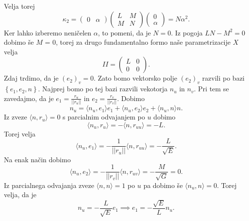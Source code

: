 Velja torej \begin{equation*}
  \kappa_2 = \begin{pmatrix}
      0 & \alpha
  \end{pmatrix} \begin{pmatrix}
  L & M \\
  M & N
  \end{pmatrix} \begin{pmatrix}
    0 \\ \alpha
  \end{pmatrix} = N \alpha^2.
\end{equation*}
Ker lahko izberemo neničelen $\alpha$, to pomeni, da je $N = 0.$ Iz pogoja $LN - M^2 = 0$ dobimo še $M$ = 0, torej za drugo fundamentalno formo naše parametrizacije $X$ velja \begin{equation*}
II = \begin{pmatrix}
L & 0 \\
0 & 0
\end{pmatrix}.
\end{equation*}  
Zdaj trdimo, da je $(e_2)_v = 0$. Zato bomo vektorsko polje $(e_2)_v$ razvili po bazi $\left\{ e_1, e_2, n\right\}$. Najprej bomo po tej bazi
razvili vekotorja $n_u$ in $n_v$. Pri tem se zavedajmo, da je $e_1 = \frac{r_u}{\lvert\lvert r_u \rvert\rvert }$ in $e_2 = \frac{r_v}{\lvert\lvert r_v \rvert\rvert }$.
Dobimo \begin{equation*}
n_u = \langle n_u, e_1 \rangle e_1 + \langle n_u, e_2 \rangle e_2 + \langle n_u, n \rangle n. 
\end{equation*}  
Iz zveze $\langle n, r_u \rangle = 0$ s parcialnim odvajanjem po $u$ dobimo \begin{equation*}
  \langle n_u, r_u \rangle = - \langle n, r_{uu} \rangle  = -L.
\end{equation*}  
Torej velja \begin{equation*}
\langle n_u, e_1 \rangle = -\frac{1}{\lvert\lvert r_u \rvert\rvert } \langle n, r_{uu} \rangle = -\frac{L}{\sqrt{E}}.   
\end{equation*}  
Na enak način dobimo \begin{equation*}
\langle n_u, e_2 \rangle = -\frac{1}{\lvert\lvert r_v \rvert\rvert } \langle n, r_{uv} \rangle = -\frac{M}{\sqrt{G}} = 0.
\end{equation*}  
Iz parcialnega odvajanja zveze $\langle n, n \rangle = 1$ po $u$ pa dobimo še $\langle n_u, n \rangle = 0$. Torej velja, da je \begin{equation*}
n_u = -\frac{L}{\sqrt{E}} e_1 \implies e_1 =-\frac{\sqrt{E} }{L} n_u.
\end{equation*}  
